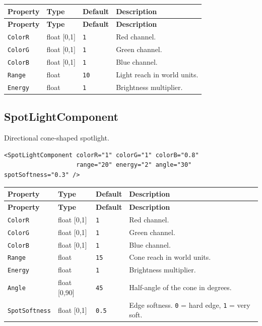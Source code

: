 \documentclass[11pt,a4paper]{article}
\begin{document}
\begin{longtable}{P{3cm} P{2cm} P{2.5cm} P{5.5cm}}
  \toprule
  \textbf{Property} & \textbf{Type} & \textbf{Default} & \textbf{Description} \\
  \midrule
  \endfirsthead
  \toprule
  \textbf{Property} & \textbf{Type} & \textbf{Default} & \textbf{Description} \\
  \midrule
  \endhead
  \texttt{ColorR} & float [0,1] & \texttt{1} & Red channel. \\
  \texttt{ColorG} & float [0,1] & \texttt{1} & Green channel. \\
  \texttt{ColorB} & float [0,1] & \texttt{1} & Blue channel. \\
  \texttt{Range} & float & \texttt{10} & Light reach in world units. \\
  \texttt{Energy} & float & \texttt{1} & Brightness multiplier. \\
  \bottomrule
\end{longtable}

\subsection{SpotLightComponent}

Directional cone-shaped spotlight.

\begin{lstlisting}
<SpotLightComponent colorR="1" colorG="1" colorB="0.8"
                    range="20" energy="2" angle="30" spotSoftness="0.3" />
\end{lstlisting}

\begin{longtable}{P{3.2cm} P{2cm} P{2.3cm} P{5.5cm}}
  \toprule
  \textbf{Property} & \textbf{Type} & \textbf{Default} & \textbf{Description} \\
  \midrule
  \endfirsthead
  \toprule
  \textbf{Property} & \textbf{Type} & \textbf{Default} & \textbf{Description} \\
  \midrule
  \endhead
  \texttt{ColorR} & float [0,1] & \texttt{1} & Red channel. \\
  \texttt{ColorG} & float [0,1] & \texttt{1} & Green channel. \\
  \texttt{ColorB} & float [0,1] & \texttt{1} & Blue channel. \\
  \texttt{Range} & float & \texttt{15} & Cone reach in world units. \\
  \texttt{Energy} & float & \texttt{1} & Brightness multiplier. \\
  \texttt{Angle} & float [0,90] & \texttt{45} & Half-angle of the cone in degrees. \\
  \texttt{SpotSoftness} & float [0,1] & \texttt{0.5} &
    Edge softness. \texttt{0} = hard edge, \texttt{1} = very soft. \\
  \bottomrule
\end{longtable}
\end{document}
